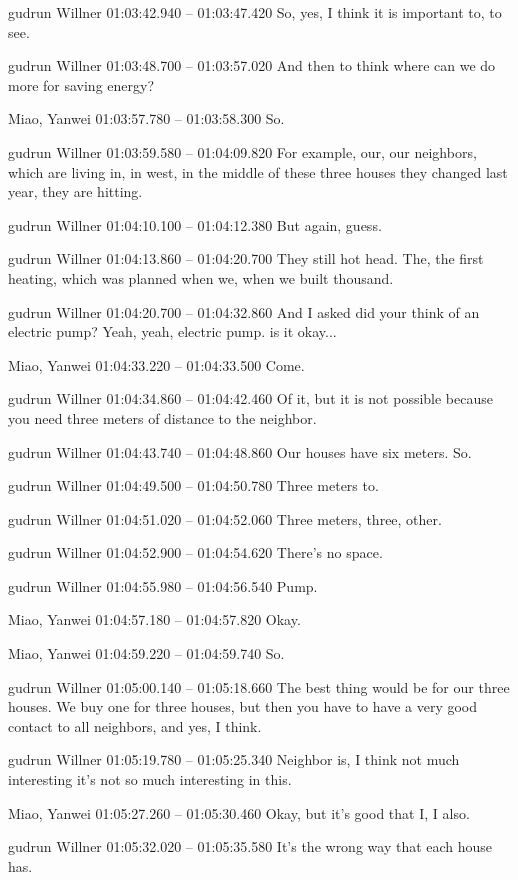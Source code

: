 {gudrun Willner 01:03:42.940 -- 01:03:47.420
So, yes, I think it is important to, to see.

gudrun Willner 01:03:48.700 -- 01:03:57.020
And then to think where can we do more for saving energy?

Miao, Yanwei 01:03:57.780 -- 01:03:58.300
So.

gudrun Willner 01:03:59.580 -- 01:04:09.820
For example, our, our neighbors, which are living in, in west, in the middle of these three houses they changed last year, they are hitting.

gudrun Willner 01:04:10.100 -- 01:04:12.380
But again, guess.

gudrun Willner 01:04:13.860 -- 01:04:20.700
They still hot head. The, the first heating, which was planned when we, when we built thousand.

gudrun Willner 01:04:20.700 -- 01:04:32.860
And I asked did your think of an electric pump? Yeah, yeah, electric pump. is it okay...

Miao, Yanwei 01:04:33.220 -- 01:04:33.500
Come.

gudrun Willner 01:04:34.860 -- 01:04:42.460
Of it, but it is not possible because you need three meters of distance to the neighbor.

gudrun Willner 01:04:43.740 -- 01:04:48.860
Our houses have six meters. So.

gudrun Willner 01:04:49.500 -- 01:04:50.780
Three meters to.

gudrun Willner 01:04:51.020 -- 01:04:52.060
Three meters, three, other.

gudrun Willner 01:04:52.900 -- 01:04:54.620
There's no space.

gudrun Willner 01:04:55.980 -- 01:04:56.540
Pump.

Miao, Yanwei 01:04:57.180 -- 01:04:57.820
Okay.

Miao, Yanwei 01:04:59.220 -- 01:04:59.740
So.

gudrun Willner 01:05:00.140 -- 01:05:18.660
The best thing would be for our three houses. We buy one for three houses, but then you have to have a very good contact to all neighbors, and yes, I think.

gudrun Willner 01:05:19.780 -- 01:05:25.340
Neighbor is, I think not much interesting it's not so much interesting in this.

Miao, Yanwei 01:05:27.260 -- 01:05:30.460
Okay, but it's good that I, I also.

gudrun Willner 01:05:32.020 -- 01:05:35.580
It's the wrong way that each house has.

}
